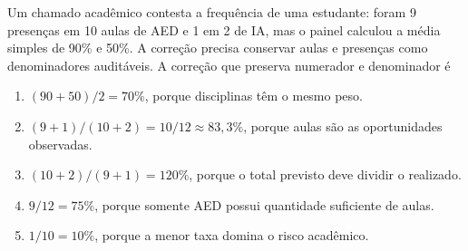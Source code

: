 \TextoBase Um chamado acadêmico contesta a frequência de uma estudante: foram 9 presenças em 10 aulas de AED e 1 em 2 de IA, mas o painel calculou a média simples de 90\% e 50\%. A correção precisa conservar aulas e presenças como denominadores auditáveis.
\FonteDidatica
\Comando A correção que preserva numerador e denominador é
\begin{enumerate}[label=\Alph*)]
\item $(90+50)/2=70\%$, porque disciplinas têm o mesmo peso.
\item $(9+1)/(10+2)=10/12\approx83{,}3\%$, porque aulas são as oportunidades observadas.
\item $(10+2)/(9+1)=120\%$, porque o total previsto deve dividir o realizado.
\item $9/12=75\%$, porque somente AED possui quantidade suficiente de aulas.
\item $1/10=10\%$, porque a menor taxa domina o risco acadêmico.
\end{enumerate}

